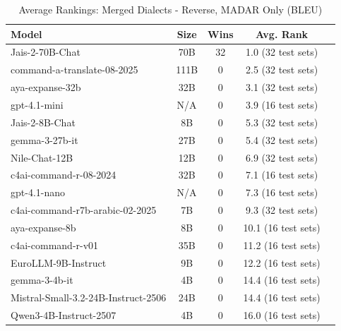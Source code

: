 \begin{table}[htbp]
\centering
\caption{Average Rankings: Merged Dialects - Reverse, MADAR Only (BLEU)}
\label{tab:avg_rankings_bleu}
\begin{tabular}{l@{\hspace{3pt}}c@{\hspace{3pt}}c@{\hspace{3pt}}c@{\hspace{3pt}}c}
\toprule
Model & Size & Wins & Avg. Rank \\
\midrule
Jais-2-70B-Chat & 70B & 32 & 1.0 (32 test sets) \\
command-a-translate-08-2025 & 111B & 0 & 2.5 (32 test sets) \\
aya-expanse-32b & 32B & 0 & 3.1 (32 test sets) \\
gpt-4.1-mini & N/A & 0 & 3.9 (16 test sets) \\
Jais-2-8B-Chat & 8B & 0 & 5.3 (32 test sets) \\
gemma-3-27b-it & 27B & 0 & 5.4 (32 test sets) \\
Nile-Chat-12B & 12B & 0 & 6.9 (32 test sets) \\
c4ai-command-r-08-2024 & 32B & 0 & 7.1 (16 test sets) \\
gpt-4.1-nano & N/A & 0 & 7.3 (16 test sets) \\
c4ai-command-r7b-arabic-02-2025 & 7B & 0 & 9.3 (32 test sets) \\
aya-expanse-8b & 8B & 0 & 10.1 (16 test sets) \\
c4ai-command-r-v01 & 35B & 0 & 11.2 (16 test sets) \\
EuroLLM-9B-Instruct & 9B & 0 & 12.2 (16 test sets) \\
gemma-3-4b-it & 4B & 0 & 14.4 (16 test sets) \\
Mistral-Small-3.2-24B-Instruct-2506 & 24B & 0 & 14.4 (16 test sets) \\
Qwen3-4B-Instruct-2507 & 4B & 0 & 16.0 (16 test sets) \\
\bottomrule
\end{tabular}
\end{table}